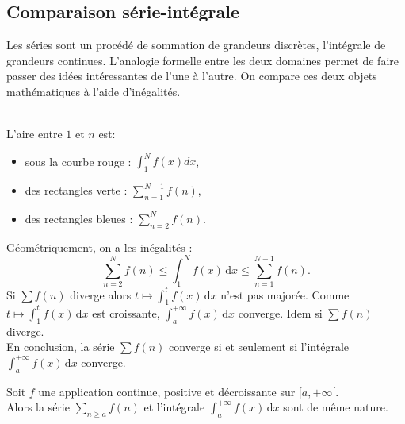 \documentclass{book}
\begin{document}
\subsection{Comparaison série-intégrale}
Les séries sont un procédé de sommation de grandeurs discrètes, l'intégrale de grandeurs continues. L'analogie formelle entre les deux domaines permet de faire passer des idées intéressantes de l'une à l'autre. On compare ces deux objets mathématiques à l'aide d'inégalités.\\
 \\
L'aire entre $1$ et $n$ est:
\begin{itemize}
\item sous la courbe rouge   : $\int_1^N f(x)dx$,
\item des rectangles verte  : $\sum_{n=1}^{N-1}f(n)$,
\item  des rectangles bleues  : $\sum_{n=2}^{N}f(n)$.
\end{itemize}
Géométriquement, on a les inégalités :
$$\sum_{n=2}^{N}f(n) \leq \int_1^N f(x)\,\mathrm dx \leq \sum_{n=1}^{N-1}f(n).$$
Si $\sum f(n)$ diverge alors $t\mapsto \int_1^t f(x)\,\mathrm dx$ n'est pas majorée. Comme $t\mapsto \int_1^t f(x)\,\mathrm dx$ est croissante,  $\int_a^{+\infty} f(x)\,\mathrm dx$ converge. Idem si $\sum f(n)$ diverge.\\
En conclusion, la série $\sum f(n)$ converge si et seulement si l'intégrale  $\int_a^{+\infty} f(x)\,\mathrm dx$ converge.
\begin{Theoreme}
Soit $f$ une application continue, positive et décroissante sur $[a,+\infty[$.\\
Alors la série $\sum_{n\geq a} f(n)$ et l'intégrale $\int_a^{+\infty} f(x)\,\mathrm dx$ sont de même nature.
\end{Theoreme}
\end{document}
